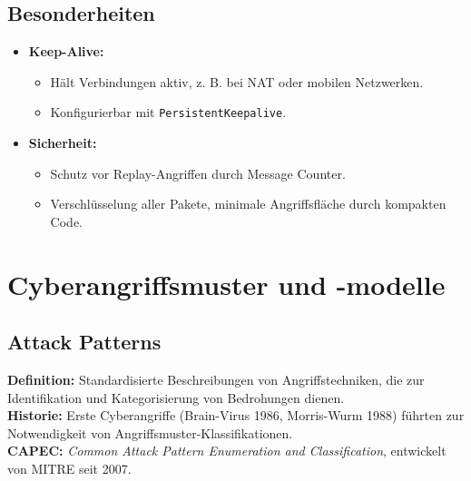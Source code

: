 \subsection{Besonderheiten}
\begin{itemize}
    \item \textbf{Keep-Alive:}
    \begin{itemize}
        \item Hält Verbindungen aktiv, z. B. bei NAT oder mobilen Netzwerken.
        \item Konfigurierbar mit \texttt{PersistentKeepalive}.
    \end{itemize}
    \item \textbf{Sicherheit:}
    \begin{itemize}
        \item Schutz vor Replay-Angriffen durch Message Counter.
        \item Verschlüsselung aller Pakete, minimale Angriffsfläche durch kompakten Code.
    \end{itemize}
\end{itemize}

\section{Cyberangriffsmuster und -modelle}

\subsection{Attack Patterns}
\textbf{Definition:} Standardisierte Beschreibungen von Angriffstechniken, die zur Identifikation und Kategorisierung von Bedrohungen dienen.\\
\textbf{Historie:} Erste Cyberangriffe (Brain-Virus 1986, Morris-Wurm 1988) führten zur Notwendigkeit von Angriffsmuster-Klassifikationen. \\
\textbf{CAPEC:} \textit{Common Attack Pattern Enumeration and Classification}, entwickelt von MITRE seit 2007.


